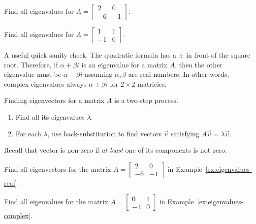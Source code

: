 \documentclass[../main.tex]{subfiles}
\begin{document}
\begin{example} \label{ex:eigenvalues-real}
  Find all eigenvalues for \(A = \begin{bmatrix} 2 & 0 \\ -6 & -1 \end{bmatrix}\).
\end{example}

\begin{example} \label{ex:eigenvalues-complex}
  Find all eigenvalues for \(A = \begin{bmatrix} 1 & 1 \\ -1 & 0 \end{bmatrix}\).
\end{example}

{\footnotesize \faExclamationTriangle{} A useful quick sanity check. The quadratic formula has a \(\pm\) in front of the square root. Therefore, if \(\alpha + \beta i\) is an eigenvalue for a matrix \(A\), then the other eigenvalue must be \(\alpha - \beta i\) assuming \(\alpha,\beta\) are real numbers.  In other words, complex eigenvalues always  \(\alpha \pm \beta i\) for \(2 \times 2\) matricies.}
\clearpage

\begin{method} \label{method:eigenvectors}
  Finding eigenvectors for a matrix \(A\) is a two-step process.
  \begin{enumerate}
    \item Find all its eigenvalues \(\lambda\). 
    \item For each \(\lambda\), use back-substitution to find  vectors \(\vec{v}\) satisfying \(A \vec{v} = \lambda \vec{v}\). 
  \end{enumerate}

  Recall that vector is non-zero if \emph{at least} one of its components is not zero.
\end{method}

\begin{example}
  Find all eigenvectors for the matrix \(A = \begin{bmatrix} 2 & 0 \\ -6 & -1\end{bmatrix}\) in Example~\ref{ex:eigenvalues-real}.
\end{example}
\clearpage

\begin{example}
  Find all eigenvalues for the matrix \(A = \begin{bmatrix} 0 & 1 \\ -1 & 0 \end{bmatrix}\) in Example~\ref{ex:eigenvalues-complex}.
\end{example}
\end{document}

